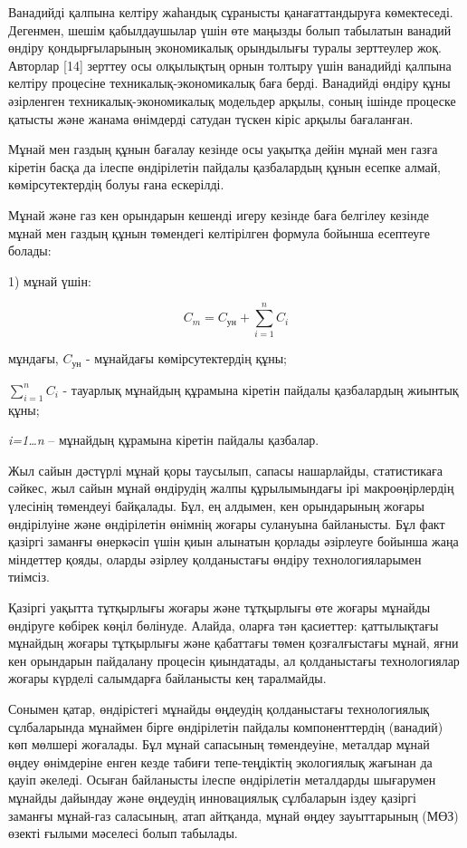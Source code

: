 \begin{multicols}{2}
Ванадийді қалпына келтіру жаһандық сұранысты қанағаттандыруға
көмектеседі. Дегенмен, шешім қабылдаушылар үшін өте маңызды болып
табылатын ванадий өндіру қондырғыларының экономикалық орындылығы туралы
зерттеулер жоқ. Авторлар {[}14{]} зерттеу осы олқылықтың орнын толтыру
үшін ванадийді қалпына келтіру процесіне техникалық-экономикалық баға
берді. Ванадийді өндіру құны әзірленген техникалық-экономикалық
модельдер арқылы, соның ішінде процеске қатысты және жанама өнімдерді
сатудан түскен кіріс арқылы бағаланған.

Мұнай мен газдың құнын бағалау кезінде осы уақытқа дейін мұнай мен газға
кіретін басқа да ілеспе өндірілетін пайдалы қазбалардың құнын есепке
алмай, көмірсутектердің болуы ғана ескерілді.

Мұнай және газ кен орындарын кешенді игеру кезінде баға белгілеу кезінде
мұнай мен газдың құнын төмендегі келтірілген формула бойынша есептеуге
болады:

  1) мұнай үшін:


\begin{equation}
  C_m = C_{\text{ун}} + \sum_{i=1}^{n} C_i
  \end{equation}

мұндағы, $C_{\text{ун}}$ - мұнайдағы көмірсутектердің құны;

$\sum_{i=1}^{n} C_i$ - тауарлық мұнайдың құрамына кіретін пайдалы
қазбалардың жиынтық құны;

\emph{i=1\ldots n} -- мұнайдың құрамына кіретін пайдалы қазбалар.

Жыл сайын дәстүрлі мұнай қоры таусылып, сапасы нашарлайды, статистикаға
сәйкес, жыл сайын мұнай өндірудің жалпы құрылымындағы ірі
макроөңірлердің үлесінің төмендеуі байқалады. Бұл, ең алдымен, кен
орындарының жоғары өндірілуіне және өндірілетін өнімнің жоғары сулануына
байланысты. Бұл факт қазіргі заманғы өнеркәсіп үшін қиын алынатын
қорлады әзірлеуге бойынша жаңа міндеттер қояды, оларды әзірлеу
қолданыстағы өндіру технологияларымен тиімсіз.

Қазіргі уақытта тұтқырлығы жоғары және тұтқырлығы өте жоғары мұнайды
өндіруге көбірек көңіл бөлінуде. Алайда, оларға тән қасиеттер:
қаттылықтағы мұнайдың жоғары тұтқырлығы және қабаттағы төмен
қозғалғыстағы мұнай, яғни кен орындарын пайдалану процесін қиындатады,
ал қолданыстағы технологиялар жоғары күрделі салымдарға байланысты кең
таралмайды.

Сонымен қатар, өндірістегі мұнайды өңдеудің қолданыстағы технологиялық
сұлбаларында мұнаймен бірге өндірілетін пайдалы компоненттердің
(ванадий) көп мөлшері жоғалады. Бұл мұнай сапасының төмендеуіне,
металдар мұнай өңдеу өнімдеріне енген кезде табиғи тепе-теңдіктің
экологиялық жағынан да қауіп әкеледі. Осыған байланысты ілеспе
өндірілетін металдарды шығарумен мұнайды дайындау және өңдеудің
инновациялық сұлбаларын іздеу қазіргі заманғы мұнай-газ саласының, атап
айтқанда, мұнай өңдеу зауыттарының (МӨЗ) өзекті ғылыми мәселесі болып
табылады.


\end{multicols}
